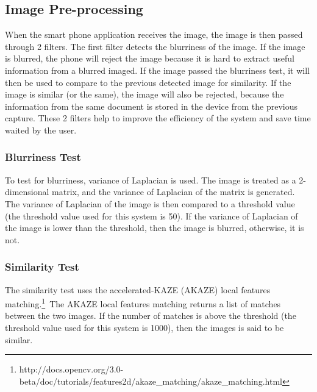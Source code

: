 \subsection{Image Pre-processing}
When the smart phone application receives the image, the image is then passed through 2 filters. The first filter detects the blurriness of the image. If the image is blurred, the phone will reject the image because it is hard to extract useful information from a blurred imaged. If the image passed the blurriness test, it will then be used to compare to the previous detected image for similarity. If the image is similar (or the same), the image will also be rejected, because the information from the same document is stored in the device from the previous capture. These 2 filters help to improve the efficiency of the system and save time waited by the user.

\subsubsection{Blurriness Test}
To test for blurriness, variance of Laplacian is used. The image is treated as a 2-dimensional matrix, and the variance of Laplacian of the matrix is generated. The variance of Laplacian of the image is then compared to a threshold value (the threshold value used for this system is 50). If the variance of Laplacian of the image is lower than the threshold, then the image is blurred, otherwise, it is not.

\subsubsection{Similarity Test}
The similarity test uses the accelerated-KAZE (AKAZE) local features matching.\footnote{http://docs.opencv.org/3.0-beta/doc/tutorials/features2d/akaze\_matching/akaze\_matching.html}~The AKAZE local features matching returns a list of matches between the two images. If the number of matches is above the threshold (the threshold value used for this system is 1000), then the images is said to be similar.

